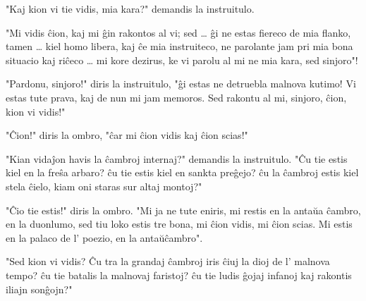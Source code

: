 "Kaj kion vi tie vidis, mia kara?" demandis la instruitulo.

"Mi vidis ĉion, kaj mi ĝin rakontos al vi; sed \ldots{} ĝi ne estas fiereco de mia flanko, tamen \ldots{} kiel homo libera, kaj ĉe mia instruiteco, ne parolante jam pri mia bona situacio kaj riĉeco \ldots{} mi kore dezirus, ke vi parolu al mi ne \glqq{}mia kara\grqq{}, sed \glqq{}sinjoro\grqq{}"!

"Pardonu, sinjoro!" diris la instruitulo, "ĝi estas ne detruebla malnova kutimo! Vi estas tute prava, kaj de nun mi jam memoros. Sed rakontu al mi, sinjoro, ĉion, kion vi vidis!"

"Ĉion!" diris la ombro, "ĉar mi ĉion vidis kaj ĉion scias!"

"Kian vidaĵon havis la ĉambroj internaj?" demandis la instruitulo. "Ĉu tie estis kiel en la freŝa arbaro? ĉu tie estis kiel en sankta preĝejo? ĉu la ĉambroj estis kiel stela ĉielo, kiam oni staras sur altaj montoj?"

"Ĉio tie estis!" diris la ombro. "Mi ja ne tute eniris, mi restis en la antaŭa ĉambro, en la duonlumo, sed tiu loko estis tre bona, mi ĉion vidis, mi ĉion scias. Mi estis en la palaco de l' poezio, en la antaŭĉambro".

"Sed kion vi vidis? Ĉu tra la grandaj ĉambroj iris ĉiuj la dioj de l' malnova tempo? ĉu tie batalis la malnovaj faristoj? ĉu tie ludis ĝojaj infanoj kaj rakontis iliajn sonĝojn?"

